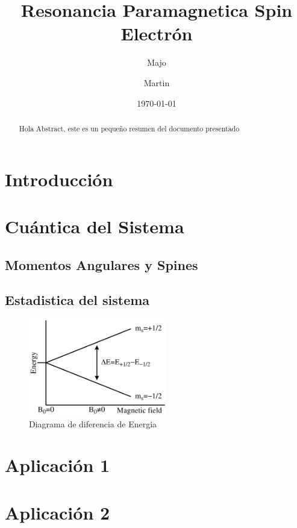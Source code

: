 \documentclass[twocolumn,amssymb,prb,aps,superscriptaddress]{revtex4}
\begin{document}
\begin{abstract}
    Hola Abstract, este es un pequeño resumen del documento presentado
\end{abstract}

\title{Resonancia Paramagnetica Spin Electrón}
\author{Majo}


\author{Martin}


\date{\today}

\maketitle

\section[Intro]{Introducción}
\label{sec:intro}

\section[]{Cuántica del Sistema}
\label{sec:cuantica}

\subsection*{Momentos Angulares y Spines}
\label{sec:momentosAngulares}

\subsection*{Estadistica del sistema}
\label{mecanicaEstadistica}

    \begin{figure}[H]
        \centering
        \includegraphics*[width=6.0cm]{images/EPR_splitting}
        \caption{Diagrama de diferencia de Energia}
        \label{fig:diagramaDiferenciaDeEnergia} 
    \end{figure}

\section[]{Aplicación 1}
\label{sec:aplicacion1}

\section[]{Aplicación 2}
\label{sec:aplicacion2}
\end{document}
